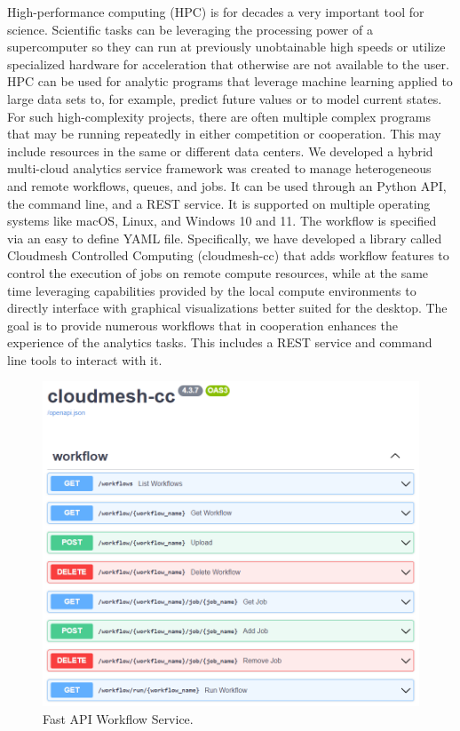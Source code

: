 High-performance computing (HPC) is for decades a very important tool for science. Scientific tasks can be leveraging the processing power of a supercomputer so they can run at previously unobtainable high speeds or utilize specialized hardware for acceleration that otherwise are not available to the user. HPC can be used for analytic programs that leverage machine learning applied to large data sets to, for example, predict future values or to model current states. For such high-complexity projects, 
there are often multiple complex programs that may be running repeatedly in either competition or cooperation. This may include resources in the same or different data centers. We developed 
a hybrid multi-cloud analytics service framework was created to manage heterogeneous and remote workflows, queues, and jobs. It can be used through an Python API, the command line, and a REST service. It is supported on multiple operating systems like macOS, Linux, and Windows 10 and 11. 
The workflow is specified via an easy to define YAML file.
Specifically, we have developed a library called Cloudmesh Controlled Computing (cloudmesh-cc) that adds workflow features to control the execution of jobs on remote compute resources, while at the same time leveraging capabilities provided by the local compute environments to directly interface with graphical visualizations better suited for the desktop. The goal is to provide numerous workflows that in cooperation enhances the experience of the analytics tasks. This includes a REST service and command line tools to interact with it.


\begin{figure}[htb]
\centering\includegraphics[width=0.7\columnwidth]{images/fastapi-service.png}
\caption{Fast API Workflow Service.}
\label{fig:fastapi-cc-arch}
\end{figure}

